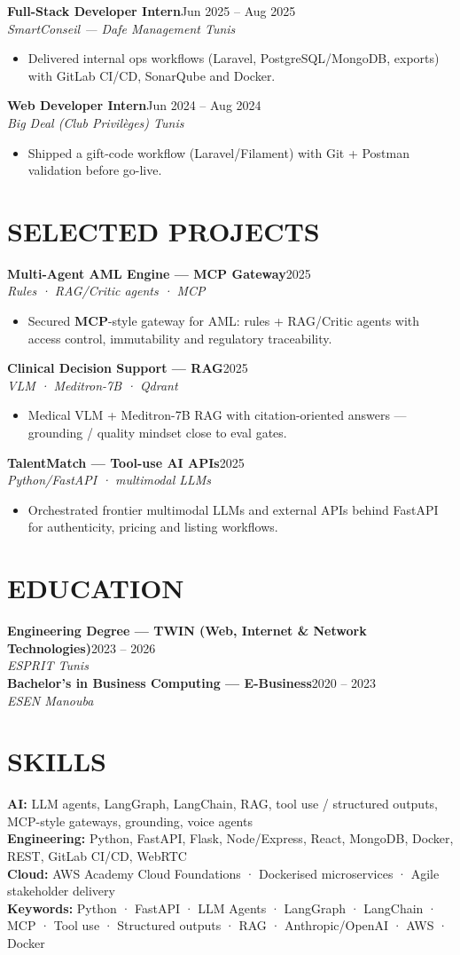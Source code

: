 \documentclass[10pt,a4paper]{article}
\newcommand{\TargetKeywords}{Python · FastAPI · LLM Agents · LangGraph · LangChain · MCP · Tool use · Structured outputs · RAG · Anthropic/OpenAI · AWS · Docker}
\newcommand{\job}[3]{%
  \textbf{\color{primary}#1}\hfill{\color{muted}\small #2}\\[-1pt]
  {\color{accent}\textit{#3}}\\[1pt]
  \begin{itemize}
}
\newcommand{\proj}[3]{%
  \textbf{\color{primary}#1}\hfill{\color{muted}\small #2}\\[-1pt]
  {\color{accent}\textit{#3}}\\[0.5pt]
  \begin{itemize}
}
\newcommand{\edu}[3]{%
  \textbf{\color{primary}#1}\hfill{\color{muted}\small #2}\\[-1pt]
  {\color{accent}\textit{#3}}\\[2pt]
}
\begin{document}
\job{Full-Stack Developer Intern}{Jun 2025 -- Aug 2025}{SmartConseil — Dafe Management \textbar{} Tunis}
  \item Delivered internal ops workflows (Laravel, PostgreSQL/MongoDB, exports) with GitLab CI/CD, SonarQube and Docker.
\end{itemize}

\job{Web Developer Intern}{Jun 2024 -- Aug 2024}{Big Deal (Club Privilèges) \textbar{} Tunis}
  \item Shipped a gift-code workflow (Laravel/Filament) with Git + Postman validation before go-live.
\end{itemize}

\section{SELECTED PROJECTS}
{\footnotesize
\proj{Multi-Agent AML Engine — MCP Gateway}{2025}{Rules · RAG/Critic agents · MCP}
  \item Secured \textbf{MCP}-style gateway for AML: rules + RAG/Critic agents with access control, immutability and regulatory traceability.
\end{itemize}
\proj{Clinical Decision Support — RAG}{2025}{VLM · Meditron-7B · Qdrant}
  \item Medical VLM + Meditron-7B RAG with citation-oriented answers — grounding / quality mindset close to eval gates.
\end{itemize}
\proj{TalentMatch — Tool-use AI APIs}{2025}{Python/FastAPI · multimodal LLMs}
  \item Orchestrated frontier multimodal LLMs and external APIs behind FastAPI for authenticity, pricing and listing workflows.
\end{itemize}
}

\section{EDUCATION}
\edu{Engineering Degree — TWIN (Web, Internet \& Network Technologies)}{2023 -- 2026}{ESPRIT \textbar{} Tunis}
\edu{Bachelor's in Business Computing — E-Business}{2020 -- 2023}{ESEN \textbar{} Manouba}

\section{SKILLS}
{\small
\textbf{\color{primary}AI:} LLM agents, LangGraph, LangChain, RAG, tool use / structured outputs, MCP-style gateways, grounding, voice agents\\[1pt]
\textbf{\color{primary}Engineering:} Python, FastAPI, Flask, Node/Express, React, MongoDB, Docker, REST, GitLab CI/CD, WebRTC\\[1pt]
\textbf{\color{primary}Cloud:} AWS Academy Cloud Foundations · Dockerised microservices · Agile stakeholder delivery\\[1pt]
\textbf{\color{primary}Keywords:} \TargetKeywords
}
\end{document}
